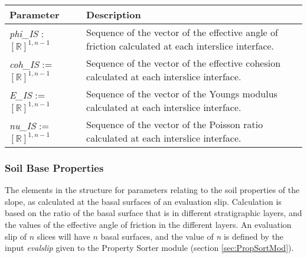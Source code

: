 \documentclass[12pt, titlepage]{article}
\begin{document}
\begin{center}
\begin{longtable}{p{} p{}}
  \hline \textbf{Parameter} & \textbf{Description} \\ \hline
    
  \textit{phi\_IS} : $[\mathbb{R}]^{1,n-1}$ & Sequence of the vector
  of the effective angle of friction calculated at each interslice
  interface. \\

  \textit{coh\_IS} := $[\mathbb{R}]^{1,n-1}$ & Sequence of the vector
  of the effective cohesion calculated at each interslice interface.\\

  \textit{E\_IS} := $[\mathbb{R}]^{1,n-1}$ & Sequence of the vector of
  the Youngs modulus calculated at each interslice interface.\\

  \textit{nu\_IS} := $[\mathbb{R}]^{1,n-1}$ & Sequence of the vector
  of the Poisson ratio calculated at each interslice
  interface. \\ \hline
\end{longtable}
\end{center}

\subsubsection{Soil Base Properties} \label{Tbl:SoilBaseParam}
The elements in the structure for parameters relating to the soil
properties of the slope, as calculated at the basal surfaces of an
evaluation slip. Calculation is based on the ratio of the basal
surface that is in different stratigraphic layers, and the values of
the effective angle of friction in the different layers. An evaluation
slip of $n$ slices will have $n$ basal surfaces, and the value of
\textit{n} is defined by the input \textit{evalslip} given to
the Property Sorter module (section \ref{sec:PropSortMod}).
\end{document}
